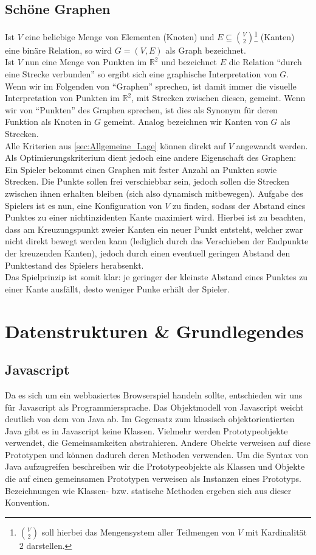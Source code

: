 \documentclass[a4paper,twocolumn]{scrartcl}
\begin{document}
\subsection{Sch\"one Graphen}
Ist $V$ eine beliebige Menge von Elementen (Knoten) und $E\subseteq\binom{V}{2}$\footnote{$\binom{V}{2}$ soll hierbei das
Mengensystem aller Teilmengen von $V$ mit Kardinalit\"at $2$ darstellen.} (Kanten) eine bin\"are Relation, so wird
$G=(V,E)$ als Graph bezeichnet.\\
Ist $V$ nun eine Menge von Punkten im $\mathbb{R}^2$ und bezeichnet $E$ die Relation "`durch eine Strecke verbunden"' so
ergibt sich eine graphische Interpretation von $G$. Wenn wir im Folgenden von "`Graphen"' sprechen, ist damit immer die
visuelle Interpretation von Punkten im $\mathbb{R}^2$, mit Strecken zwischen diesen, gemeint. Wenn wir von "`Punkten"'
des Graphen sprechen, ist dies als Synonym f\"ur deren Funktion als Knoten in $G$ gemeint. Analog bezeichnen wir Kanten
von $G$ als Strecken.\\
Alle Kriterien aus \ref{sec:Allgemeine_Lage} k\"onnen direkt auf $V$ angewandt werden. Als Optimierungskriterium
dient jedoch eine andere Eigenschaft des Graphen: Ein Spieler bekommt einen Graphen mit fester Anzahl an Punkten
sowie Strecken. Die Punkte sollen frei verschiebbar sein, jedoch sollen die Strecken zwischen ihnen erhalten bleiben
(sich also dynamisch mitbewegen). Aufgabe des Spielers ist es nun, eine Konfiguration von $V$ zu finden, sodass der
Abstand eines Punktes zu einer nichtinzidenten Kante maximiert wird. Hierbei ist zu beachten, dass am Kreuzungspunkt
zweier Kanten ein neuer Punkt entsteht, welcher zwar nicht direkt bewegt werden kann (lediglich durch das Verschieben
der Endpunkte der kreuzenden Kanten), jedoch durch einen eventuell geringen Abstand den Punktestand des Spielers
herabsenkt.\\
Das Spielprinzip ist somit klar: je geringer der kleinste Abstand eines Punktes zu einer Kante ausf\"allt, desto weniger
Punke erh\"alt der Spieler.

\section{Datenstrukturen \& Grundlegendes}
\subsection{Javascript}
Da es sich um ein webbasiertes Browserspiel handeln sollte, entschieden wir uns für Javascript als Programmiersprache.
Das Objektmodell von Javascript weicht deutlich von dem von Java ab. Im Gegensatz zum klassisch objektorientierten Java gibt es in Javascript keine Klassen.
Vielmehr werden Prototypeobjekte verwendet, die Gemeinsamkeiten abstrahieren. Andere Obekte verweisen auf diese Prototypen 
und können dadurch deren Methoden verwenden. Um die Syntax von Java aufzugreifen beschreiben
wir die Prototypeobjekte als Klassen und Objekte die auf einen gemeinsamen Prototypen verweisen als Instanzen eines Prototyps. 
Bezeichnungen wie Klassen- bzw. statische Methoden ergeben sich aus dieser Konvention.
\end{document}
